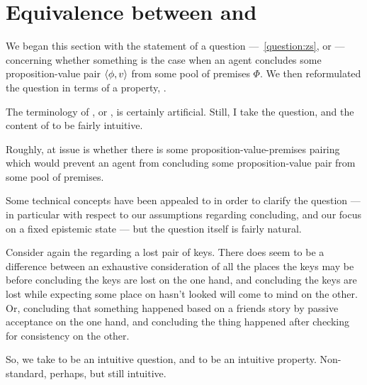 \section{Equivalence between \qzS{} and \izetaS{}}
\label{sec:overview:an-equiv-stat-of-zs}

\begin{note}
  We began this section with the statement of a question ---~\autoref{question:zs}, or \qzS{}  --- concerning whether something is the case when an agent concludes some proposition-value pair \(\langle \phi, v \rangle\) from some pool of premises \(\Phi\).
  We then reformulated the question in terms of a property, \zS{}.

  The terminology of \zS{}, or , is certainly artificial.
  Still, I take the question, and the content of \zS{} to be fairly intuitive.

  Roughly, at issue is whether there is some proposition-value-premises pairing which would prevent an agent from concluding some proposition-value pair from some pool of premises.

  Some technical concepts have been appealed to in order to clarify the question --- in particular with respect to our assumptions regarding concluding, and our focus on a fixed epistemic state --- but the question itself is fairly natural.

  Consider again the  regarding a lost pair of keys.
  There does seem to be a difference between an exhaustive consideration of all the places the keys may be before concluding the keys are lost on the one hand, and concluding the keys are lost while expecting some place on hasn't looked will come to mind on the other.
  Or, concluding that something happened based on a friends story by passive acceptance on the one hand, and concluding the thing happened after checking for consistency on the other.

  So, we take \qzS{} to be an intuitive question, and \zS{} to be an intuitive property.
  Non-standard, perhaps, but still intuitive.
\end{note}

